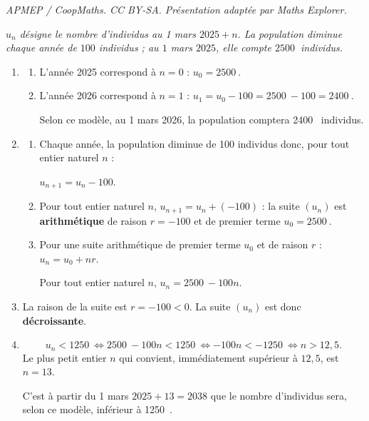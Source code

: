 \documentclass[10pt]{article}
\providecommand{\np}[2][]{{#2~#1}}
\begin{document}
\noindent\textit{APMEP / CoopMaths. CC BY-SA. Présentation adaptée par Maths Explorer.}\par\medskip
\emph{$u_n$ désigne le nombre d'individus au 1 mars $2025+n$. La population diminue
chaque année de $100$ individus ; au $1$ mars $2025$, elle compte $\np{2500}$ individus.}

\begin{enumerate}
	\item
	\begin{enumerate}
		\item L'année 2025 correspond à $n = 0$ : $u_0 = \np{2500}$.

		\item L'année 2026 correspond à $n = 1$ :
		$u_1 = u_0 - 100 = \np{2500} - 100 = \np{2400}$.

		Selon ce modèle, au 1 mars 2026, la population comptera \np{2400} individus.
	\end{enumerate}

	\item
	\begin{enumerate}
		\item Chaque année, la population diminue de 100 individus donc, pour tout entier naturel $n$ :
		
		$u_{n+1} = u_n - 100$.

		\item Pour tout entier naturel $n$, $u_{n+1} = u_n + (-100)$ : la suite $(u_n)$ est
		\textbf{arithmétique} de raison $r = -100$ et de premier terme $u_0 = \np{2500}$.

		\item Pour une suite arithmétique de premier terme $u_0$ et de raison $r$ :
		$u_n = u_0 + nr$.

		Pour tout entier naturel $n$, $u_n = \np{2500} - 100n$.
	\end{enumerate}

	\item La raison de la suite est $r = -100 < 0$. La suite $(u_n)$ est donc \textbf{décroissante}.

	\item
	\[u_n < \np{1250} \iff \np{2500} - 100n < \np{1250} \iff -100n < -\np{1250} \iff n > 12,5.\]
	Le plus petit entier $n$ qui convient, immédiatement supérieur à $12,5$,  est $n = 13$.

	C'est à partir du 1 mars $2025 + 13 = 2038$ que le nombre d'individus
	sera, selon ce modèle, inférieur à \np{1250}.
\end{enumerate}

\medskip
\end{document}
